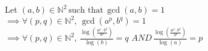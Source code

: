 \documentclass{article}
\begin{document}
\noindent Let $ (a,b) \in \mathbb{N}^2 \, \text{such that} \, \gcd(a, b) = 1$\\
$\implies \forall (p,q) \in \mathbb{N}^2, \, \gcd(a^p, b^q) = 1 $\\
$\implies \forall (p,q) \in \mathbb{N}^2, \,  \frac{\log\left(\frac{a^p \cdot b^q}{a^p}\right)}{\log(b)} = q $
$AND \,  \frac{\log\left(\frac{a^p \cdot b^q}{b^q}\right)}{\log(a)} = p$
\end{document}
